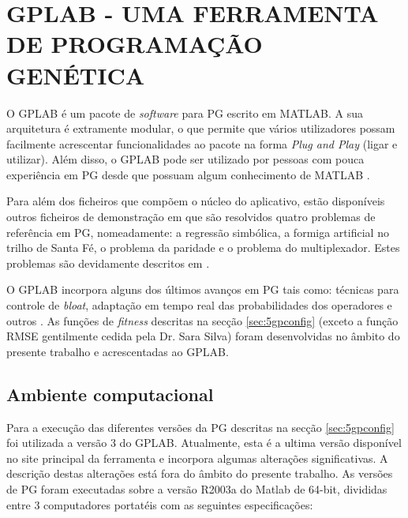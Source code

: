 \section{GPLAB - UMA FERRAMENTA DE PROGRAMAÇÃO GENÉTICA}
\label{sec:5gplab}

O \ac{GPLAB} é um pacote de \emph{software} para \ac{PG} escrito em MATLAB. 
A sua arquitetura é extramente modular, o que permite que vários
utilizadores possam facilmente acrescentar funcionalidades ao pacote na forma \emph{Plug and Play} (ligar e utilizar). 
Além disso, o \ac{GPLAB} 
pode ser utilizado por pessoas com pouca experiência em \ac{PG} desde que possuam algum conhecimento de MATLAB \citep{Silva2005}.

Para além dos ficheiros que compõem o núcleo do aplicativo,
estão disponíveis outros ficheiros de demonstração em que são resolvidos quatro problemas de referência em \ac{PG}, nomeadamente: a regressão 
simbólica, a formiga artificial no trilho de Santa Fé, o problema da paridade e o problema do multiplexador. Estes problemas são devidamente
descritos em \citep{Koza1992}.

O \ac{GPLAB} incorpora alguns dos últimos avanços em \ac{PG} tais como: técnicas para controle de \emph{bloat}, adaptação em tempo real das probabilidades dos 
operadores e outros \citep{Silva2005}. As funções de \emph{fitness} descritas na secção \ref{sec:5gpconfig} (exceto a função
\ac{RMSE} gentilmente cedida pela Dr. Sara Silva) foram desenvolvidas no âmbito do presente trabalho e acrescentadas ao \ac{GPLAB}.

\subsection{Ambiente computacional}

Para a execução das diferentes versões da \ac{PG} descritas na secção \ref{sec:5gpconfig} foi utilizada a versão $3$ do \ac{GPLAB}.
Atualmente, esta é a ultima versão disponível no site principal da ferramenta e incorpora algumas alterações significativas.
A descrição destas alterações está fora do âmbito do presente trabalho. As versões de \ac{PG} foram executadas sobre a 
versão R2003a do Matlab de 64-bit, divididas entre $3$ computadores portatéis com as seguintes especificações:

